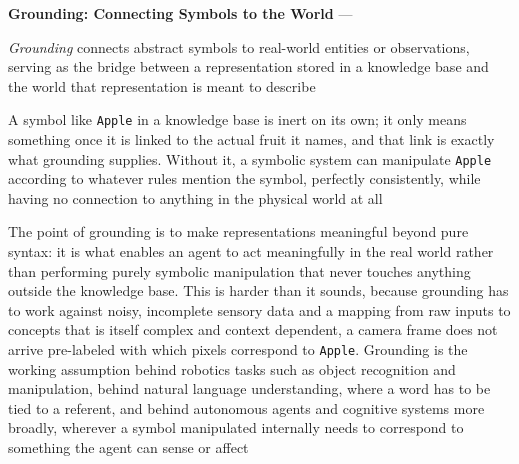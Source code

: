 \textbf{Grounding: Connecting Symbols to the World} --- \begin{definition}
  \emph{Grounding} connects abstract symbols to real-world entities or
  observations, serving as the bridge between a representation stored in a
  knowledge base and the world that representation is meant to describe
\end{definition}
A symbol like \texttt{Apple} in a knowledge base is inert on its own; it
only means something once it is linked to the actual fruit it names, and
that link is exactly what grounding supplies. Without it, a symbolic system
can manipulate \texttt{Apple} according to whatever rules mention the
symbol, perfectly consistently, while having no connection to anything in
the physical world at all

The point of grounding is to make representations meaningful beyond pure
syntax: it is what enables an agent to act meaningfully in the real world
rather than performing purely symbolic manipulation that never touches
anything outside the knowledge base. This is harder than it sounds, because
grounding has to work against noisy, incomplete sensory data and a mapping
from raw inputs to concepts that is itself complex and context dependent, a
camera frame does not arrive pre-labeled with which pixels correspond to
\texttt{Apple}. Grounding is the working assumption behind robotics tasks
such as object recognition and manipulation, behind natural language
understanding, where a word has to be tied to a referent, and behind
autonomous agents and cognitive systems more broadly, wherever a symbol
manipulated internally needs to correspond to something the agent can
sense or affect

